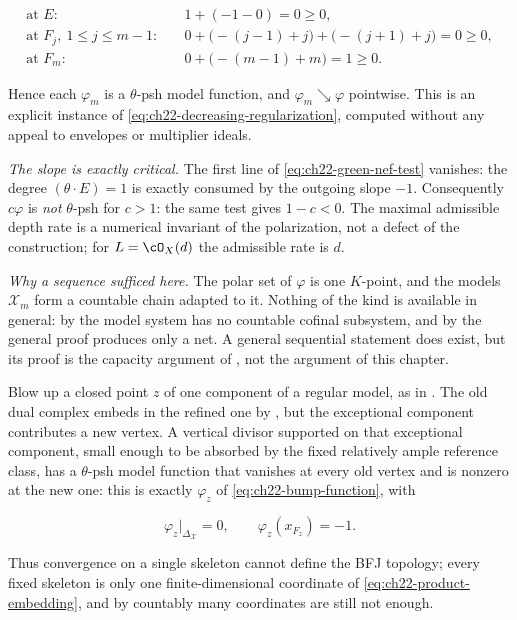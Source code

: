 \begin{example}
\[
 \begin{aligned}
 \text{at }E:&\quad 1+(-1-0)=0\geq0,\\
 \text{at }F_j,\ 1\leq j\leq m-1:&\quad
   0+\bigl(-(j-1)+j\bigr)+\bigl(-(j+1)+j\bigr)=0\geq0,\\
 \text{at }F_m:&\quad 0+\bigl(-(m-1)+m\bigr)=1\geq0 .
 \end{aligned}
\tag{22.86}\label{eq:ch22-green-nef-test}
\]

Hence each $\varphi_m$ is a $\theta$-psh model function, and
$\varphi_m\searrow\varphi$ pointwise.  This is an explicit instance of
\eqref{eq:ch22-decreasing-regularization}, computed without any appeal to
envelopes or multiplier ideals.

\emph{The slope is exactly critical.}  The first line of
\eqref{eq:ch22-green-nef-test} vanishes: the degree $(\theta\cdot E)=1$ is
exactly consumed by the outgoing slope $-1$.  Consequently
$c\varphi$ is \emph{not} $\theta$-psh for $c>1$: the same test gives
$1-c<0$.  The maximal admissible depth rate is a numerical invariant of
the polarization, not a defect of the construction; for
$L=\cO_X(d)$ the admissible rate is $d$.

\emph{Why a sequence sufficed here.}  The polar set of $\varphi$ is one
$K$-point, and the models $\mathcal X_m$ form a countable chain adapted
to it.  Nothing of the kind is available in general: by
 the model system has no countable
cofinal subsystem, and by  the general
proof produces only a net.  A general sequential statement does exist, but
its proof is the capacity argument of
, not the argument of this chapter.
\end{example}

\begin{example}
\label{ex:ch22-one-skeleton-insufficient}
Blow up a closed point $z$ of one component of a regular model, as in
.  The old dual complex embeds in the refined one by
, but the exceptional component contributes a
new vertex.  A vertical divisor supported on that exceptional component,
small enough to be absorbed by the fixed relatively ample reference class,
has a $\theta$-psh model function that vanishes at every old vertex and is
nonzero at the new one: this is exactly
$\varphi_z$ of \eqref{eq:ch22-bump-function}, with

\[
 \varphi_z|_{\Delta_{\mathcal X}}=0,
 \qquad
 \varphi_z(x_{F_z})=-1 .
\]

Thus convergence on a single skeleton cannot define the BFJ topology; every
fixed skeleton is only one finite-dimensional coordinate of
\eqref{eq:ch22-product-embedding}, and by
 countably many coordinates are still not
enough.
\end{example}

